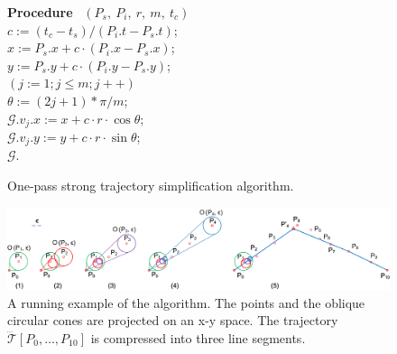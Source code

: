 \begin{figure}[tb!]
\begin{center}
{\begin{minipage}{3.36in}
{					{\bf Procedure} ~$(P_s,~P_i,~r,~m,~t_c)$ \\
					\bcc \hspace{1ex} $c := (t_c-t_s)/(P_i.t - P_s.t)$; \\
					\icc \hspace{1ex} $x := P_s.x + c\cdot(P_i.x-P_s.x)$; \\
					\icc \hspace{1ex} $y := P_s.y + c\cdot(P_i.y-P_s.y)$; \\
					\icc \hspace{1ex} \For $(j := 1;j \le m;j++)$ \Do \\
					\icc \> \hspace{2ex} $\theta :=  (2j + 1)*\pi /m $; \\
					\icc \> \hspace{2ex} $\mathcal{G}.v_j.x := x + c\cdot r\cdot\cos\theta$;\\
					\icc \> \hspace{2ex} $\mathcal{G}.v_j.y := y + c\cdot r\cdot\sin\theta$;\\
					\icc \hspace{1ex} \Return $\mathcal{G}$.
				}
				\vspace{-2ex}
				\myhrule
			\end{minipage}
		}
	\end{center}
	\vspace{-2ex}
	\caption{\small One-pass strong trajectory  simplification algorithm.}
	\label{alg:CI3d}
	\vspace{-2ex}
\end{figure}


\begin{figure}[tb!]
\centering
\includegraphics[scale=0.79]{figures/Fig-conesta.png}
\caption{\small A running example of the \cista algorithm. The points and the oblique circular cones are projected on an x-y space. The trajectory $\dddot{\mathcal{T}}[P_0, \ldots, P_{10}]$ is compressed into three line segments.}
\vspace{-2ex}
\label{fig:exm-consta}
\end{figure}


